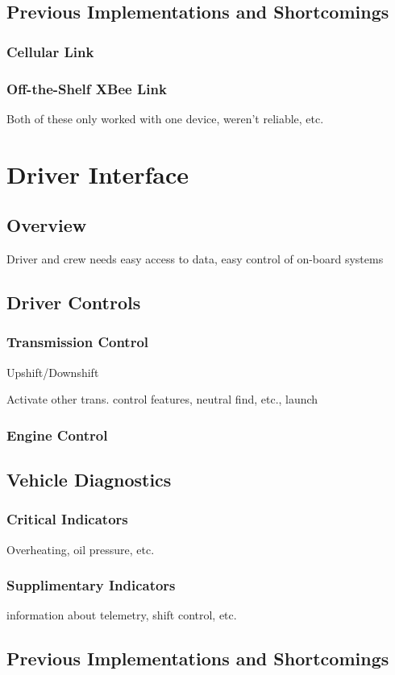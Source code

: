 \subsection{Previous Implementations and Shortcomings}


\subsubsection{Cellular Link}


\subsubsection{Off-the-Shelf XBee Link}

Both of these only worked with one device, weren't reliable, etc.


\section{Driver Interface}


\subsection{Overview}

Driver and crew needs easy access to data, easy control of on-board
systems


\subsection{Driver Controls}


\subsubsection{Transmission Control}

Upshift/Downshift

Activate other trans. control features, neutral find, etc., launch


\subsubsection{Engine Control}


\subsection{Vehicle Diagnostics}


\subsubsection{Critical Indicators}

Overheating, oil pressure, etc.


\subsubsection{Supplimentary Indicators}

information about telemetry, shift control, etc.


\subsection{Previous Implementations and Shortcomings}